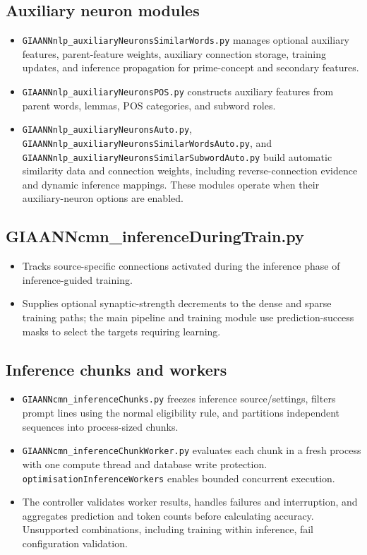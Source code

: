 \subsection{Auxiliary neuron modules}
\begin{itemize}
	\item \texttt{GIAANNnlp\_auxiliaryNeuronsSimilarWords.py} manages optional auxiliary features, parent-feature weights, auxiliary connection storage, training updates, and inference propagation for prime-concept and secondary features.
	\item \texttt{GIAANNnlp\_auxiliaryNeuronsPOS.py} constructs auxiliary features from parent words, lemmas, POS categories, and subword roles.
	\item \texttt{GIAANNnlp\_auxiliaryNeuronsAuto.py}, \texttt{GIAANNnlp\_auxiliaryNeuronsSimilarWordsAuto.py}, and \texttt{GIAANNnlp\_auxiliaryNeuronsSimilarSubwordAuto.py} build automatic similarity data and connection weights, including reverse-connection evidence and dynamic inference mappings. These modules operate when their auxiliary-neuron options are enabled.
\end{itemize}

\subsection{GIAANNcmn\_inferenceDuringTrain.py}
\begin{itemize}
	\item Tracks source-specific connections activated during the inference phase of inference-guided training.
	\item Supplies optional synaptic-strength decrements to the dense and sparse training paths; the main pipeline and training module use prediction-success masks to select the targets requiring learning.
\end{itemize}

\subsection{Inference chunks and workers}
\begin{itemize}
	\item \texttt{GIAANNcmn\_inferenceChunks.py} freezes inference source/settings, filters prompt lines using the normal eligibility rule, and partitions independent sequences into process-sized chunks.
	\item \texttt{GIAANNcmn\_inferenceChunkWorker.py} evaluates each chunk in a fresh process with one compute thread and database write protection. \texttt{optimisationInferenceWorkers} enables bounded concurrent execution.
	\item The controller validates worker results, handles failures and interruption, and aggregates prediction and token counts before calculating accuracy. Unsupported combinations, including training within inference, fail configuration validation.
\end{itemize}

